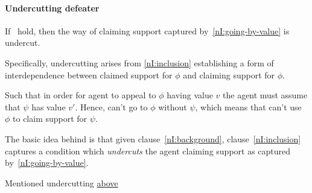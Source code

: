 \paragraph{Undercutting defeater}

  {\color{green}
    If~\nIBackground{} hold, then the way of claiming support captured by~\ref{nI:going-by-value} is undercut.

    Specifically, undercutting arises from \ref{nI:inclusion} establishing a form of interdependence between claimed support for \(\phi\) and claiming support for \(\phi\).

    Such that in order for agent to appeal to \(\phi\) having value \(v\) the agent must assume that \(\psi\) has value \(v'\).
    Hence, can't go to \(\phi\) without \(\psi\), which means that can't use \(\phi\) to claim support for \(\psi\).
  }

\begin{note}
  The basic idea behind \nI{} is that given clause~\ref{nI:background}, clause~\ref{nI:inclusion} captures a condition which \emph{undercuts} the agent claiming support as captured by~\ref{nI:going-by-value}.

  Mentioned undercutting {\color{red} \hyperref[first-mention-undercutting-defeater]{above}}
\end{note}

